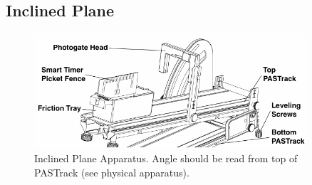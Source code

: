 \subsection{Inclined Plane}
\begin{figure}[h]
    \begin{center}
        \includegraphics[width=0.9\textwidth]{./Exp1-4/pic/apparatus.png}
    \end{center}
    \caption{Inclined Plane Apparatus. Angle should be read from top of PASTrack (see physical apparatus).}
    \label{fig:apparatusplane}
\end{figure}

